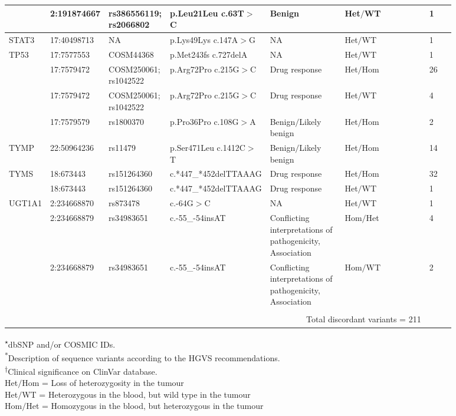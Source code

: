 \begin{landscape}
\begin{longtable}{p{0.09\linewidth}|p{0.1\linewidth}p{0.12\linewidth}p{0.14\linewidth}p{0.17\linewidth}p{0.2\linewidth}p{0.06\linewidth}}
		& 2:191874667 & rs386556119; rs2066802 & p.Leu21Leu c.63T$>$C & Benign & Het$/$WT & 1
		\\
		\hline
		STAT3 & 17:40498713 & NA & p.Lys49Lys c.147A$>$G & NA & Het$/$WT & 1
		\\
		\hline
		TP53 & 17:7577553 & COSM44368 & p.Met243fs c.727delA & NA & Het$/$WT & 1
		\\
		& 17:7579472 & COSM250061; rs1042522 & p.Arg72Pro c.215G$>$C & Drug response & Het$/$Hom & 26
		\\
		& 17:7579472 & COSM250061; rs1042522 & p.Arg72Pro c.215G$>$C & Drug response & Het$/$WT & 4
		\\
		& 17:7579579 & rs1800370 & p.Pro36Pro c.108G$>$A & Benign$/$Likely benign & Het$/$Hom & 2
		\\
		\hline
		TYMP & 22:50964236 & rs11479 & p.Ser471Leu c.1412C$>$T & Benign$/$Likely benign & Het$/$Hom & 14
		\\
		\hline
		TYMS & 18:673443 & rs151264360 & \footnotesize{c.*447\_*452delTTAAAG} & Drug response & Het$/$Hom & 32
		\\
		& 18:673443 & rs151264360 & \footnotesize{c.*447\_*452delTTAAAG} & Drug response & Het$/$WT & 1
		\\
		\hline
		UGT1A1 & 2:234668870 & rs873478 & c.-64G$>$C & NA & Het$/$WT & 1
		\\
		& 2:234668879 & rs34983651 & c.-55\_-54insAT & Conflicting interpretations of pathogenicity, Association & Hom$/$Het & 4
		\\
		& 2:234668879 & rs34983651 & c.-55\_-54insAT & Conflicting interpretations of pathogenicity, Association & Hom$/$WT & 2
		\\
		\hline
		\\
		&
		\multicolumn{5}{r}{Total discordant variants = 211}
		&
		\\
		\hline
\end{longtable}

\noindent\textsuperscript{$\star$}dbSNP and/or COSMIC IDs.
\\
\textsuperscript{*}Description of sequence variants according to the HGVS recommendations.
\\
\textsuperscript{$\dagger$}Clinical significance on ClinVar database.
\\
Het$/$Hom = Loss of heterozygosity in the tumour
\\
Het$/$WT = Heterozygous in the blood, but wild type in the tumour
\\
Hom$/$Het = Homozygous in the blood, but heterozygous in the tumour

\end{landscape}

